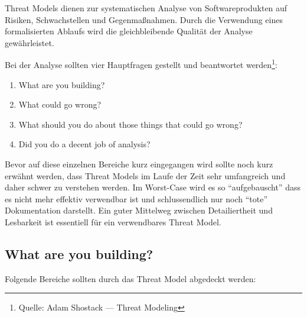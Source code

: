 Threat Models dienen zur systematischen Analyse von Softwareprodukten auf Risiken, Schwachstellen und Gegenmaßnahmen. Durch die Verwendung eines formalisierten Ablaufs wird die gleichbleibende Qualität der Analyse gewährleistet.

Bei der Analyse sollten vier Hauptfragen gestellt und beantwortet werden\footnote{Quelle: Adam Shostack --- Threat Modeling}:

\begin{enumerate}
	\item What are you building?
	\item What could go wrong?
	\item What should you do about those things that could go wrong?
	\item Did you do a decent job of analysis?
\end{enumerate}

Bevor auf diese einzelnen Bereiche kurz eingegangen wird sollte noch kurz erwähnt werden, dass Threat Models im Laufe der Zeit sehr umfangreich und daher schwer zu verstehen werden. Im Worst-Case wird es so ``aufgebauscht'' dass es nicht mehr effektiv verwendbar ist und schlussendlich nur noch ``tote'' Dokumentation darstellt. Ein guter Mittelweg zwischen Detailiertheit und Lesbarkeit ist essentiell für ein verwendbares Threat Model.

\subsection{What are you building?}

Folgende Bereiche sollten durch das Threat Model abgedeckt werden:

